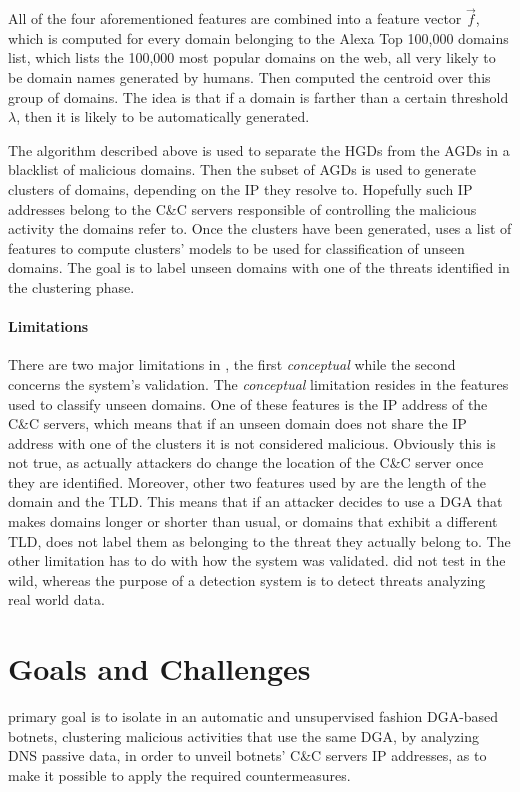 All of the four aforementioned features are combined into a feature vector
$\vec{f}$, which is computed for every domain belonging to the Alexa Top
100,000 domains list, which lists the 100,000 most popular domains on the web,
all very likely to be domain names generated by humans. Then \citet{schiavoni2013}
computed the centroid over this group of domains. The idea is that if a
domain is farther than a certain threshold $\lambda$, then it is likely to be
automatically generated.

The algorithm described above is used to separate the HGDs from the AGDs in a
blacklist of malicious domains. Then the subset of AGDs is used to generate
clusters of domains, depending on the IP they resolve to. Hopefully such IP
addresses belong to the C\&C servers responsible of controlling the malicious
activity the domains refer to.
Once the clusters have been generated, \phoenix uses a list of features to
compute clusters' models to be used for classification of unseen domains.
The goal is to label unseen domains with one of the threats identified in
the clustering phase.

\paragraph{Limitations}
There are two major limitations in \phoenix, the first \emph{conceptual} while the
second concerns the system's validation. The \emph{conceptual} limitation resides
in the features used to classify unseen domains. One of these features is the
IP address of the C\&C servers, which means that if an unseen domain does not
share the IP address with one of the clusters it is not considered malicious.
Obviously this is not true, as actually attackers do change the location
of the C\&C server once they are identified. Moreover, other two features
used by \citet{schiavoni2013} are the length of the domain and the TLD. This means
that if an attacker decides to use a DGA that makes domains longer or shorter
than usual, or domains that exhibit a different TLD, \phoenix does not
label them as belonging to the threat they actually belong to.
The other limitation has to do with how the system was validated.
\citet{schiavoni2013} did not test \phoenix in the wild, whereas
the purpose of a detection system is to detect threats analyzing real world
data.



\section{Goals and Challenges} %
\label{sec:goals_and_challenges}
 primary goal is to isolate in an automatic and unsupervised fashion DGA-based botnets, clustering malicious activities that use the same DGA, by analyzing DNS passive data, in order to unveil botnets' C\&C servers IP addresses,
as to make it possible to apply the required countermeasures.

